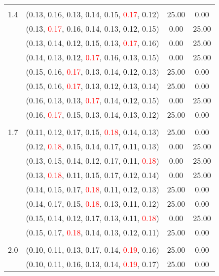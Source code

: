 \documentclass[10pt,a4paper]{report}
\begin{document}
\begin{center}
\begin{longtable}{clcc}
		&&&\\
		1.4			&(0.13, 0.16, 0.13, 0.14, 0.15, \textcolor{red}{0.17}, \textcolor{black}{0.12})&25.00&0.00\\
			&(0.13, \textcolor{red}{0.17}, 0.16, 0.14, 0.13, \textcolor{black}{0.12}, 0.15)&0.00&25.00\\
			&(0.13, 0.14, \textcolor{black}{0.12}, 0.15, 0.13, \textcolor{red}{0.17}, 0.16)&0.00&25.00\\
			&(0.14, 0.13, \textcolor{black}{0.12}, \textcolor{red}{0.17}, 0.16, 0.13, 0.15)&0.00&25.00\\
			&(0.15, 0.16, \textcolor{red}{0.17}, 0.13, 0.14, \textcolor{black}{0.12}, 0.13)&25.00&0.00\\
			&(0.15, 0.16, \textcolor{red}{0.17}, 0.13, \textcolor{black}{0.12}, 0.13, 0.14)&25.00&0.00\\
			&(0.16, 0.13, 0.13, \textcolor{red}{0.17}, 0.14, \textcolor{black}{0.12}, 0.15)&0.00&25.00\\
			&(0.16, \textcolor{red}{0.17}, 0.15, 0.13, 0.14, 0.13, \textcolor{black}{0.12})&25.00&0.00\\
		&&&\\
		1.7			&(\textcolor{black}{0.11}, 0.12, 0.17, 0.15, \textcolor{red}{0.18}, 0.14, 0.13)&25.00&0.00\\
			&(0.12, \textcolor{red}{0.18}, 0.15, 0.14, 0.17, \textcolor{black}{0.11}, 0.13)&0.00&25.00\\
			&(0.13, 0.15, 0.14, 0.12, 0.17, \textcolor{black}{0.11}, \textcolor{red}{0.18})&0.00&25.00\\
			&(0.13, \textcolor{red}{0.18}, \textcolor{black}{0.11}, 0.15, 0.17, 0.12, 0.14)&0.00&25.00\\
			&(0.14, 0.15, 0.17, \textcolor{red}{0.18}, \textcolor{black}{0.11}, 0.12, 0.13)&25.00&0.00\\
			&(0.14, 0.17, 0.15, \textcolor{red}{0.18}, 0.13, \textcolor{black}{0.11}, 0.12)&25.00&0.00\\
			&(0.15, 0.14, 0.12, 0.17, 0.13, \textcolor{black}{0.11}, \textcolor{red}{0.18})&0.00&25.00\\
			&(0.15, 0.17, \textcolor{red}{0.18}, 0.14, 0.13, 0.12, \textcolor{black}{0.11})&25.00&0.00\\
		&&&\\
		2.0			&(\textcolor{black}{0.10}, 0.11, 0.13, 0.17, 0.14, \textcolor{red}{0.19}, 0.16)&25.00&0.00\\
			&(\textcolor{black}{0.10}, 0.11, 0.16, 0.13, 0.14, \textcolor{red}{0.19}, 0.17)&25.00&0.00\\

\end{longtable}
\end{center}
\end{document}
